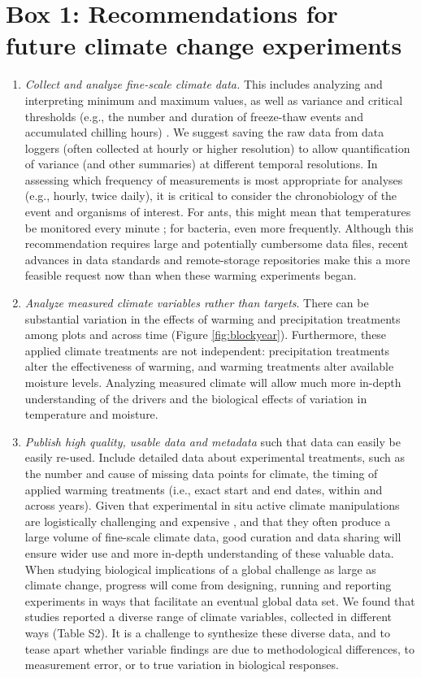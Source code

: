 \documentclass{article}
\begin{document}
\section* {Box 1: Recommendations for future climate change experiments} 
\begin{enumerate}
\item\textit{Collect and analyze fine-scale climate data.} This includes analyzing and interpreting minimum and maximum values, as well as variance and critical thresholds (e.g., the number and duration of freeze-thaw events and accumulated chilling hours) \citep{mcdaniel2014,vasseur2014}. We suggest saving the raw data from data loggers (often collected at hourly or higher resolution) to allow quantification of variance (and other summaries) at different temporal resolutions. In assessing which frequency of measurements is most appropriate for analyses (e.g., hourly, twice daily), it is critical to consider the chronobiology of the event and organisms of interest. For ants, this might mean that temperatures be monitored every minute \citep{shavit2017}; for bacteria, even more frequently. Although this recommendation requires large and potentially cumbersome data files, recent advances in data standards and remote-storage repositories make this a more feasible request now than when these warming experiments began. %
\item\textit{Analyze measured climate variables rather than targets}. There can be substantial variation in the effects of warming and precipitation treatments among plots and across time (Figure \ref{fig:blockyear}). Furthermore, these applied climate treatments are not independent: precipitation treatments alter the effectiveness of warming, and warming treatments alter available moisture levels. Analyzing measured climate will allow much more in-depth understanding of the drivers and the biological effects of variation in temperature and moisture. %
\item\textit{Publish high quality, usable data and metadata} such that data can easily be easily re-used. Include detailed data about experimental treatments, such as the number and cause of missing data points for climate, the timing of applied warming treatments (i.e., exact start and end dates, within and across years). Given that experimental in situ active climate manipulations are logistically challenging and expensive \citep{aronson2009}, and that they often produce a large volume of fine-scale climate data, good curation and data sharing will ensure wider use and more in-depth understanding of these valuable data. When studying biological implications of a global challenge as large as climate change, progress will come from designing, running and reporting experiments in ways that facilitate an eventual global data set. We found that studies reported a diverse range of climate variables, collected in different ways (Table S2). It is a challenge to synthesize these diverse data, and to tease apart whether variable findings are due to methodological differences, to measurement error, or to true variation in biological responses. %

\end{enumerate}
\end{document}
